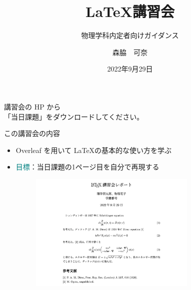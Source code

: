 \documentclass[dvipdfmx]{beamer}
\title{\LaTeX 講習会}
\author{森脇　可奈}
\date{2022年9月29日}
\subtitle{物理学科内定者向けガイダンス}
\begin{document}
\begin{frame}
\titlepage
\centering
\footnotesize{講習会の HP から\\「当日課題」をダウンロードしてください。}

\end{frame}

\begin{frame}{この講習会の内容}
\begin{itemize}
    \item Overleaf を用いて \LaTeX の基本的な使い方を学ぶ
    
    \bigskip
    \item \textcolor{teal}{目標}：当日課題の1ページ目を自分で再現する
    \begin{figure}
        \centering
        \includegraphics[width=8cm]{fig_kadai.pdf}
    \end{figure}
\end{itemize}
\end{frame}
\end{document}
